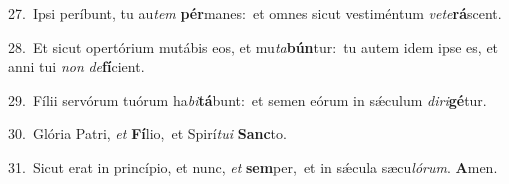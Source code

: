 {\numbfont\textcolor{\numbcolor}{27.}}~Ipsi períbunt, tu au\textit{tem} \textbf{pér}\-manes:~\star et omnes sicut vestiméntum \textit{ve}\-\textit{te}\textbf{rá}scent.\par
{\numbfont\textcolor{\numbcolor}{28.}}~Et sicut opertórium mutábis eos, et mu\-\textit{ta}\-\textbf{bún}tur:~\star tu autem idem ipse es, et anni tui \textit{non} \textit{de}\-\textbf{fí}cient.\par
{\numbfont\textcolor{\numbcolor}{29.}}~Fílii servórum tuórum ha\-\textit{bi}\-\textbf{tá}bunt:~\star et semen eórum in sǽculum \textit{di}\-\textit{ri}\textbf{gé}tur.\par
{\numbfont\textcolor{\numbcolor}{30.}}~Glória Patri, \textit{et} \textbf{Fí}\-lio,~\star et Spirí\-\textit{tu}\-\textit{i} \textbf{Sanc}\-to.\par
{\numbfont\textcolor{\numbcolor}{31.}}~Sicut erat in princípio, et nunc, \textit{et} \textbf{sem}\-per,~\star et in sǽcula sæcu\-\textit{ló}\-\textit{rum}. \textbf{A}\-men.\par
